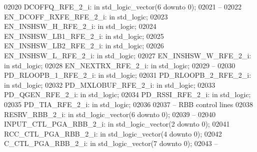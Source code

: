 \begin{DoxyCode}
02020     DCOFFQ\_RFE\_2\_i: \textcolor{keywordflow}{in} \textcolor{comment}{std\_logic\_vector}(\textcolor{vhdllogic}{}\textcolor{vhdllogic}{6} \textcolor{keywordflow}{downto} \textcolor{vhdllogic}{}\textcolor{vhdllogic}{0});
02021 \textcolor{keyword}{    --}
02022     EN\_DCOFF\_RXFE\_RFE\_2\_i:  \textcolor{keywordflow}{in} \textcolor{comment}{std\_logic};
02023     EN\_INSHSW\_H\_RFE\_2\_i:    \textcolor{keywordflow}{in} \textcolor{comment}{std\_logic};
02024     EN\_INSHSW\_LB1\_RFE\_2\_i:  \textcolor{keywordflow}{in} \textcolor{comment}{std\_logic};
02025     EN\_INSHSW\_LB2\_RFE\_2\_i:  \textcolor{keywordflow}{in} \textcolor{comment}{std\_logic};
02026     EN\_INSHSW\_L\_RFE\_2\_i:    \textcolor{keywordflow}{in} \textcolor{comment}{std\_logic};
02027     EN\_INSHSW\_W\_RFE\_2\_i:    \textcolor{keywordflow}{in} \textcolor{comment}{std\_logic};
02028     EN\_NEXTRX\_RFE\_2\_i:  \textcolor{keywordflow}{in} \textcolor{comment}{std\_logic};
02029 \textcolor{keyword}{    --}
02030     PD\_RLOOPB\_1\_RFE\_2\_i:    \textcolor{keywordflow}{in} \textcolor{comment}{std\_logic};
02031     PD\_RLOOPB\_2\_RFE\_2\_i:    \textcolor{keywordflow}{in} \textcolor{comment}{std\_logic};
02032     PD\_MXLOBUF\_RFE\_2\_i: \textcolor{keywordflow}{in} \textcolor{comment}{std\_logic};
02033     PD\_QGEN\_RFE\_2\_i:    \textcolor{keywordflow}{in} \textcolor{comment}{std\_logic};
02034     PD\_RSSI\_RFE\_2\_i:    \textcolor{keywordflow}{in} \textcolor{comment}{std\_logic};
02035     PD\_TIA\_RFE\_2\_i: \textcolor{keywordflow}{in} \textcolor{comment}{std\_logic};
02036 
02037 \textcolor{keyword}{    -- RBB control lines }
02038     RESRV\_RBB\_2\_i:  \textcolor{keywordflow}{in} \textcolor{comment}{std\_logic\_vector}(\textcolor{vhdllogic}{}\textcolor{vhdllogic}{6} \textcolor{keywordflow}{downto} \textcolor{vhdllogic}{}\textcolor{vhdllogic}{0});
02039 \textcolor{keyword}{    --}
02040     INPUT\_CTL\_PGA\_RBB\_2\_i:  \textcolor{keywordflow}{in} \textcolor{comment}{std\_logic\_vector}(\textcolor{vhdllogic}{}\textcolor{vhdllogic}{2} \textcolor{keywordflow}{downto} \textcolor{vhdllogic}{}\textcolor{vhdllogic}{0});
02041     RCC\_CTL\_PGA\_RBB\_2\_i:    \textcolor{keywordflow}{in} \textcolor{comment}{std\_logic\_vector}(\textcolor{vhdllogic}{}\textcolor{vhdllogic}{4} \textcolor{keywordflow}{downto} \textcolor{vhdllogic}{}\textcolor{vhdllogic}{0});
02042     C\_CTL\_PGA\_RBB\_2\_i:  \textcolor{keywordflow}{in} \textcolor{comment}{std\_logic\_vector}(\textcolor{vhdllogic}{}\textcolor{vhdllogic}{7} \textcolor{keywordflow}{downto} \textcolor{vhdllogic}{}\textcolor{vhdllogic}{0});
02043 \textcolor{keyword}{    --}

\end{DoxyCode}
